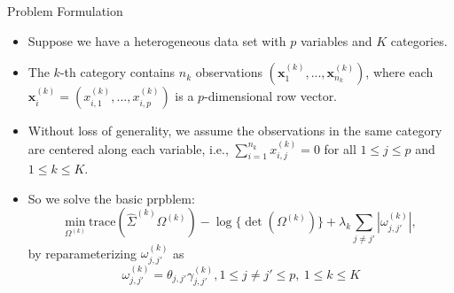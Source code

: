 \documentclass[xcolor=dvipsnames,aspectratio=1610]{beamer}
\theoremstyle{remark}
\begin{document}
\begin{frame}{Problem Formulation}
  \begin{itemize}
    \setlength{\itemsep}{10pt}
  \item Suppose we have a heterogeneous data set with $p$ variables and $K$ categories.
  
   \item The $k$-th
  category contains $n_k$ observations $(\boldsymbol{x}_1^{(k)},...,\boldsymbol{x}_{n_k}^{(k)})$, where each $\boldsymbol{x}_i^{(k)} = (x_{i,1}^{(k)},...,x_{i,p}^{(k)})$ is a $p$-dimensional row vector.

   \item Without loss of generality, we assume the observations in the same category are centered along each variable, i.e., $\sum_{i=1}^{n_k} x_{i,j}^{(k)} = 0$ for all $1 \leq j \leq p$ and $1 \leq k \leq K$.

\item So we solve the basic prpblem: 
\begin{equation*}
     \underset{\Omega^{(k)}}{\mbox{min}} \  \mbox{trace} (\hat{\Sigma}^{(k)} \Omega^{(k)}) - \log\{ \det(\Omega^{(k)})\} + \lambda_k \sum_{j \neq j'} |\omega_{j,j'}^{(k)}|,
\end{equation*}
by reparameterizing $\omega_{j,j'}^{(k)}$  as     
      \begin{equation*}
     \omega_{j,j'}^{(k)} = \theta_{j,j'} \gamma_{j,j'}^{(k)}, 1\leq j \neq j' \leq p, \ 1\leq k \leq K 
\end{equation*}
  \end{itemize}
\end{frame}
\end{document}
